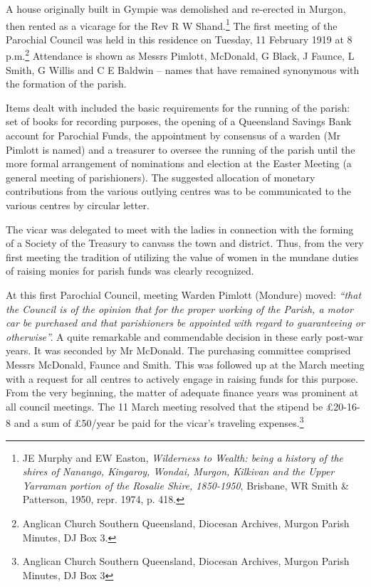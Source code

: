 A house originally built in Gympie was demolished and re-erected in Murgon, then rented as a vicarage for the Rev R W Shand.\footnote{JE Murphy and EW Easton, \emph{Wilderness to Wealth: being a history of the shires of Nanango, Kingaroy, Wondai, Murgon, Kilkivan and the Upper Yarraman portion of the Rosalie Shire, 1850-1950}, Brisbane, WR Smith \& Patterson, 1950, repr. 1974, p. 418.} The first meeting of the Parochial Council was held in this residence on Tuesday, 11 February 1919 at 8 p.m.\footnote{Anglican Church Southern Queensland, Diocesan Archives, Murgon Parish Minutes, DJ Box 3.} Attendance is shown as Messrs Pimlott, McDonald, G Black, J Faunce, L Smith, G Willis and C E Baldwin -- names that have remained synonymous with the formation of the parish.


Items dealt with included the basic requirements for the running of the parish: set of books for recording purposes, the opening of a Queensland Savings Bank account for Parochial Funds, the appointment by consensus of a warden (Mr Pimlott is named) and a treasurer to oversee the running of the parish until the more formal arrangement of nominations and election at the Easter Meeting (a general meeting of parishioners). The suggested allocation of monetary contributions from the various outlying centres was to be communicated to the various centres by circular letter.



The vicar was delegated to meet with the ladies in connection with the forming of a Society of the Treasury to canvass the town and district. Thus, from the very first meeting the tradition of utilizing the value of women in the mundane duties of raising monies for parish funds was clearly recognized.



At this first Parochial Council, meeting Warden Pimlott (Mondure) moved: \emph{``that the Council is of the opinion that for the proper working of the Parish, a motor car be purchased and that parishioners be appointed with regard to guaranteeing or otherwise''.} A quite remarkable and commendable decision in these early post-war years. It was seconded by Mr McDonald. The purchasing committee comprised Messrs McDonald, Faunce and Smith. This was followed up at the March meeting with a request for all centres to actively engage in raising funds for this purpose. From the very beginning, the matter of adequate finance years was prominent at all council meetings. The 11 March meeting resolved that the stipend be \pounds20-16-8 and a sum of \pounds50/year be paid for the vicar's traveling expenses.\footnote{Anglican Church Southern Queensland, Diocesan Archives, Murgon Parish Minutes, DJ Box 3}


